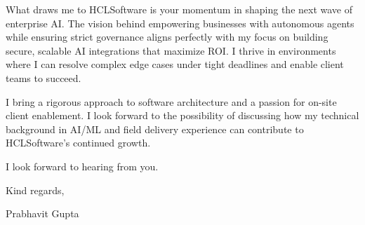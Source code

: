 \documentclass[11pt,a4paper]{article}
\begin{document}
\vspace{1em}
\noindent What draws me to HCLSoftware is your momentum in shaping the next wave of enterprise AI. The vision behind empowering businesses with autonomous agents while ensuring strict governance aligns perfectly with my focus on building secure, scalable AI integrations that maximize ROI. I thrive in environments where I can resolve complex edge cases under tight deadlines and enable client teams to succeed.

\vspace{1em}
\noindent I bring a rigorous approach to software architecture and a passion for on-site client enablement. I look forward to the possibility of discussing how my technical background in AI/ML and field delivery experience can contribute to HCLSoftware's continued growth.

\vspace{1em}
\noindent I look forward to hearing from you.

\vspace{1em}
\noindent Kind regards,

\vspace{2em}
\noindent Prabhavit Gupta
\end{document}
